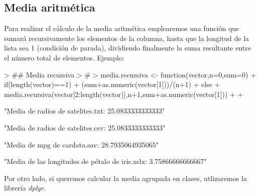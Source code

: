 \documentclass [a4paper] {article}
\begin{document}
\subsection{Media aritmética}
Para realizar el cálculo de la media aritmética emplearemos una función que sumará recursivamente los elementos de la columna, hasta que
la longitud de la lista sea 1 (condición de parada), dividiendo finalmente la suma resultante entre el número total de elementos.
\newpage
Ejemplo:
\begin{Schunk}
\begin{Sinput}
> ## Media recursiva
> # 
> media.recursiva <- function(vector,n=0,sum=0){
+ 	if(length(vector)==1){
+ 		(sum+as.numeric(vector[1]))/(n+1)
+ 	} else{
+ 		media.recursiva(vector[2:length(vector)],n+1,sum+as.numeric(vector[1]))
+ 	}
+ }
\end{Sinput}
\end{Schunk}
\begin{Schunk}
\begin{Soutput}
[1] "Media de radios de satelites.txt:  25.0833333333333"
\end{Soutput}
\begin{Soutput}
[1] "Media de radios de satelites.csv:  25.0833333333333"
\end{Soutput}
\begin{Soutput}
[1] "Media de mpg de cardata.sav:  28.7935064935065"
\end{Soutput}
\begin{Soutput}
[1] "Media de las longitudes de pétalo de iris.xslx:  3.75866666666667"
\end{Soutput}
\end{Schunk}

Por otro lado, si queremos calcular la media agrupada en clases, utlizaremos la librería \textit{dplyr}.
\end{document}
